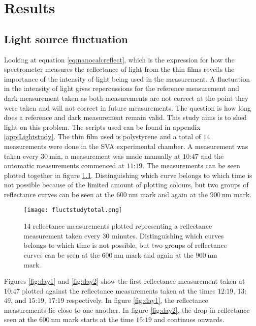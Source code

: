 \documentclass[MasterThesisMain.tex]{subfiles}
\begin{document}
\chapter{Results} \label{ch:results}

\section{Light source fluctuation}
Looking at equation \ref{eq:nanocalcreflect}, which is the expression for how the spectrometer measures the reflectance of light from the thin films reveils the importance of the intensity of light being used in the measurement. A fluctuation in the intensity of light gives repercussions for the reference measurement and dark measurement taken as both measurements are not correct at the point they were taken and will not correct in future measurements. The question is how long does a reference and dark measurement remain valid. This study aims is to shed light on this problem. The scripts used can be found in appendix \ref{app:Lightstudy}. The thin film used is polystyrene and a total of $14$ measurements were done in the SVA experimental chamber. A measurement was taken every $\SI{30}{\minute}$, a measurement was made manually at $10$:$47$ and the automatic measurements commenced at $11$:$19$. The measurements can be seen plotted together in figure \ref{fig:daytotal}. Distinguishing which curve belongs to which time is not possible because of the limited amount of plotting colours, but two groups of reflectance curves can be seen at the $\SI{600}{\nano\meter}$ mark and again at the $\SI{900}{\nano\meter}$ mark.
  
\begin{figure}
\centering
\texttt{[image: fluctstudytotal.png]}
\caption{14 reflectance measurements plotted representing a reflectance measurement taken every $30$ minutes. Distinguishing which curves belongs to which time is not possible, but two groups of reflectance curves can be seen at the $\SI{600}{\nano\meter}$ mark and again at the $\SI{900}{\nano\meter}$ mark.}
\label{fig:daytotal}
\end{figure}

Figures \ref{fig:day1} and \ref{fig:day2} show the first reflectance measurement taken at $10$:$47$ plotted against the reflectance measurements taken at the times $12$:$19$, $13$:$49$, and $15$:$19$, $17$:$19$ respectively. In figure \ref{fig:day1}, the reflectance measurements lie close to one another. In figure \ref{fig:day2}, the drop in reflectance seen at the $\SI{600}{\nano\meter}$ mark starts at the time $15$:$19$ and continues onwards. 
\end{document}
